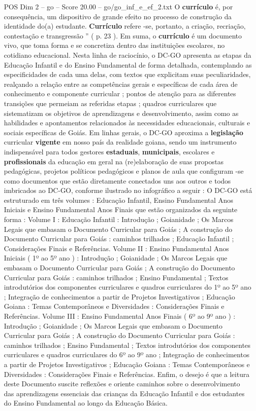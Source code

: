 \begin{textsample}{POS Dim 2 – go – Score 20.00 – go/go\_inf\_e\_ef\_2.txt}
O \textbf{currículo} é, por consequência, um dispositivo de grande efeito no processo de construção da identidade do(a) estudante. \textbf{Currículo} refere -se, portanto, a criação, recriação, contestação e transgressão ” ( p. 23 ).
Em suma, o \textbf{currículo} é um documento vivo, que toma forma e se concretiza dentro das instituições escolares, no cotidiano educacional.
Nesta linha de raciocínio, o DC-GO apresenta as etapas da Educação Infantil e do Ensino Fundamental de forma detalhada, contemplando as especificidades de cada uma delas, com textos que explicitam suas peculiaridades, realçando a relação entre as competências gerais e específicas de cada área de conhecimento e componente curricular ; pontos de atenção para as diferentes transições que permeiam as referidas etapas ; quadros curriculares que sistematizam os objetivos de aprendizagens e desenvolvimento, assim como as habilidades e apontamentos relacionados às necessidades educacionais, culturais e sociais específicas de Goiás.
Em linhas gerais, o DC-GO aproxima a \textbf{legislação} curricular \textbf{vigente} em nosso país da realidade goiana, sendo um instrumento indispensável para todos gestores \textbf{estaduais}, \textbf{municipais}, escolares e \textbf{profissionais} da educação em geral na (re)elaboração de suas propostas pedagógicas, projetos políticos pedagógicos e planos de aula que configuram -se como documentos que estão diretamente conectados uns aos outros e todos imbricados ao DC-GO, conforme ilustrado no infográfico a seguir : O DC-GO está estruturado em três volumes : Educação Infantil, Ensino Fundamental Anos Iniciais e Ensino Fundamental Anos Finais que estão organizados da seguinte forma : Volume I : Educação Infantil : Introdução ; Goianidade ; Os Marcos Legais que embasam o Documento Curricular para Goiás ; A construção do Documento Curricular para Goiás : caminhos trilhados ; Educação Infantil ; Considerações Finais e Referências.
Volume II : Ensino Fundamental Anos Iniciais ( 1º ao 5º ano ) : Introdução ; Goianidade ; Os Marcos Legais que embasam o Documento Curricular para Goiás ; A construção do Documento Curricular para Goiás : caminhos trilhados ; Ensino Fundamental ; Textos introdutórios dos componentes curriculares e quadros curriculares do 1º ao 5º ano ; Integração de conhecimentos a partir de Projetos Investigativos ; Educação Goiana : Temas Contemporâneos e Diversidades : Considerações Finais e Referências.
Volume III : Ensino Fundamental Anos Finais ( 6º ao 9º ano ) : Introdução ; Goianidade ; Os Marcos Legais que embasam o Documento Curricular para Goiás ; A construção do Documento Curricular para Goiás : caminhos trilhados ; Ensino Fundamental ; Textos introdutórios dos componentes curriculares e quadros curriculares do 6º ao 9º ano ; Integração de conhecimentos a partir de Projetos Investigativos ; Educação Goiana : Temas Contemporâneos e Diversidades : Considerações Finais e Referências.
Enfim, o desejo é que a leitura deste Documento suscite reflexões e oriente caminhos sobre o desenvolvimento das aprendizagens essenciais das crianças da Educação Infantil e dos estudantes do Ensino Fundamental ao longo da Educação Básica.


\end{textsample}
